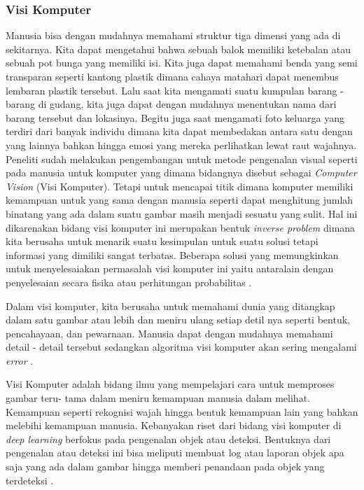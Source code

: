 \subsubsection{Visi Komputer}
\label{sec:visikomputer}

\par Manusia bisa dengan mudahnya memahami struktur tiga dimensi yang ada di sekitarnya. Kita dapat mengetahui bahwa
sebuah balok memiliki ketebalan atau sebuah pot bunga yang memiliki isi. Kita juga dapat memahami benda yang semi transparan
seperti kantong plastik dimana cahaya matahari dapat menembus lembaran plastik tersebut. Lalu saat kita mengamati suatu kumpulan
barang - barang di gudang, kita juga dapat dengan mudahnya menentukan nama dari barang tersebut dan lokasinya. Begitu juga saat
mengamati foto keluarga yang terdiri dari banyak individu dimana kita dapat membedakan antara satu dengan yang lainnya bahkan hingga
emosi yang mereka perlihatkan lewat raut wajahnya. Peneliti sudah melakukan pengembangan untuk metode pengenalan visual seperti pada
manusia untuk komputer yang dimana bidangnya disebut sebagai \emph{Computer Vision} (Visi Komputer). Tetapi untuk mencapai titik dimana
komputer memiliki kemampuan untuk yang sama dengan manusia seperti dapat menghitung jumlah binatang yang ada dalam suatu gambar masih menjadi
sesuatu yang sulit. Hal ini dikarenakan bidang visi komputer ini merupakan bentuk \emph{inverse problem} dimana kita berusaha untuk menarik
suatu kesimpulan untuk suatu solusi tetapi informasi yang dimiliki sangat terbatas. Beberapa solusi yang memungkinkan untuk menyelesaiakan
permasalah visi komputer ini yaitu antaralain dengan penyelesaian secara fisika atau perhitungan probabilitas \cite{szeliski2010computer}.

\par Dalam visi komputer, kita berusaha untuk memahami dunia yang ditangkap dalam satu gambar atau lebih dan meniru ulang setiap detil nya seperti
bentuk, pencahayaan, dan pewarnaan. Manusia dapat dengan mudahnya memahami detail - detail tersebut sedangkan algoritma visi komputer
akan sering mengalami \emph{error} \cite{margaret2008mind}.

\newpage

\par Visi Komputer adalah bidang ilmu yang mempelajari cara untuk memproses gambar teru- tama dalam meniru
kemampuan manusia dalam melihat. Kemampuan seperti rekognisi wajah hingga bentuk kemampuan lain yang bahkan
melebihi kemampuan manusia. Kebanyakan riset dari bidang visi komputer di \emph{deep learning} berfokus pada
pengenalan objek atau deteksi. Bentuknya dari pengenalan atau deteksi ini bisa meliputi membuat log atau laporan
objek apa saja yang ada dalam gambar hingga memberi penandaan pada objek yang terdeteksi \cite{Goodfellow-et-al-2016}.

